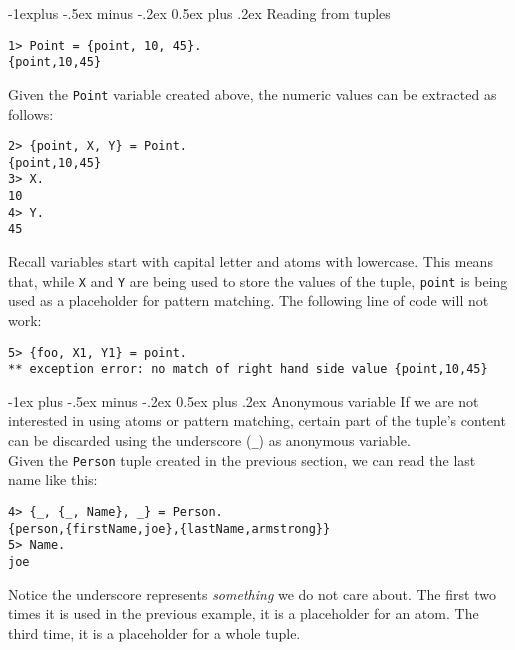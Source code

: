 \documentclass[10pt,landscape]{article}
\makeatletter
\renewcommand{\section}{\@startsection{section}{1}{0mm}%
                                {-1ex plus -.5ex minus -.2ex}%
                                {0.5ex plus .2ex}%
                                {\normalfont\large\bfseries}}
\renewcommand{\subsection}{\@startsection{subsection}{2}{0mm}%
                                {-1explus -.5ex minus -.2ex}%
                                {0.5ex plus .2ex}%
                                {\normalfont\normalsize\bfseries}}
\makeatother
\begin{document}
\begin{multicols}{3}
\subsection{Reading from tuples}
\begin{verbatim}
1> Point = {point, 10, 45}.
{point,10,45}
\end{verbatim}
Given the \texttt{Point} variable created above, the numeric values can be extracted as follows:
\begin{verbatim}
2> {point, X, Y} = Point.
{point,10,45}
3> X.
10
4> Y.
45
\end{verbatim}
Recall variables start with capital letter and atoms with lowercase. This means that, while \texttt{X} and \texttt{Y} are being used to store the values of the tuple, \texttt{point} is being used as a placeholder for pattern matching. The following line of code will not work:
\begin{verbatim}
5> {foo, X1, Y1} = point.
** exception error: no match of right hand side value {point,10,45}
\end{verbatim}
\section{Anonymous variable}
If we are not interested in using atoms or pattern matching, certain part of the tuple's content can be discarded using the underscore (\texttt{\_}) as anonymous variable. \\
Given the \texttt{Person} tuple created in the previous section, we can read the last name like this:
\begin{verbatim}
4> {_, {_, Name}, _} = Person.
{person,{firstName,joe},{lastName,armstrong}}
5> Name.
joe
\end{verbatim}
Notice the underscore represents \textit{something} we do not care about. The first two times it is used in the previous example, it is a placeholder for an atom. The third time, it is a placeholder for a whole tuple.

\end{multicols}
\end{document}
